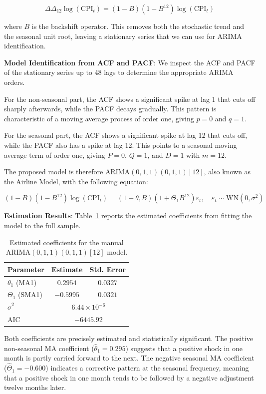 \[
\Delta \Delta_{12} \log(\text{CPI}_t) = (1 - B)(1 - B^{12})\log(\text{CPI}_t)
\]

where $B$ is the backshift operator. This removes both the stochastic trend and the seasonal unit root, leaving a stationary series that we can use for ARIMA identification.

\textbf{Model Identification from ACF and PACF}: We inspect the ACF and PACF of the stationary series up to 48 lags to determine the appropriate ARIMA orders.

For the non-seasonal part, the ACF shows a significant spike at lag 1 that cuts off sharply afterwards, while the PACF decays gradually. This pattern is characteristic of a moving average process of order one, giving $p = 0$ and $q = 1$.

For the seasonal part, the ACF shows a significant spike at lag 12 that cuts off, while the PACF also has a spike at lag 12. This points to a seasonal moving average term of order one, giving $P = 0$, $Q = 1$, and $D = 1$ with $m = 12$.

The proposed model is therefore $\text{ARIMA}(0,1,1)(0,1,1)[12]$, also known as the Airline Model, with the following equation:

\[
(1 - B)(1 - B^{12})\log(\text{CPI}_t) = (1 + \theta_1 B)(1 + \Theta_1 B^{12})\varepsilon_t, \quad \varepsilon_t \sim \text{WN}(0, \sigma^2)
\]

\textbf{Estimation Results}: Table~\ref{tab:manual} reports the estimated coefficients from fitting the model to the full sample.

\begin{table}[h]
\centering
\begin{tabular}{lcc}
\hline
Parameter & Estimate & Std. Error \\
\hline
$\theta_1$ (MA1)  &  $0.2954$ & $0.0327$ \\
$\Theta_1$ (SMA1) & $-0.5995$ & $0.0321$ \\
\hline
$\hat{\sigma}^2$ & \multicolumn{2}{c}{$6.44 \times 10^{-6}$} \\
AIC              & \multicolumn{2}{c}{$-6445.92$} \\
\hline
\end{tabular}
\caption{Estimated coefficients for the manual ARIMA$(0,1,1)(0,1,1)[12]$ model.}
\label{tab:manual}
\end{table}

Both coefficients are precisely estimated and statistically significant. The positive non-seasonal MA coefficient ($\hat{\theta}_1 = 0.295$) suggests that a positive shock in one month is partly carried forward to the next. The negative seasonal MA coefficient ($\hat{\Theta}_1 = -0.600$) indicates a corrective pattern at the seasonal frequency, meaning that a positive shock in one month tends to be followed by a negative adjustment twelve months later.

